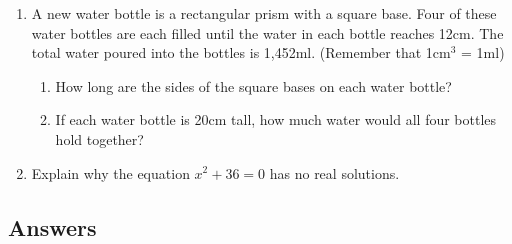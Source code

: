 \documentclass[a4paper,12pt]{article}
\begin{document}
\begin{enumerate}
\item A new water bottle is a rectangular prism with a square base.
Four of these water bottles are each filled until the water
in each bottle reaches 12cm. The total water poured into the 
bottles is 1,452ml. (Remember that 1cm$^3$ = 1ml)

\begin{enumerate}
\item How long are the sides of the square bases on each 
water bottle?
\item If each water bottle is 20cm tall, how much water would 
all four bottles hold together?
\end{enumerate}

\item Explain why the equation $x^2 + 36 = 0$ has no 
real solutions.

\end{enumerate}

\newpage
\subsection*{Answers}
\end{document}
